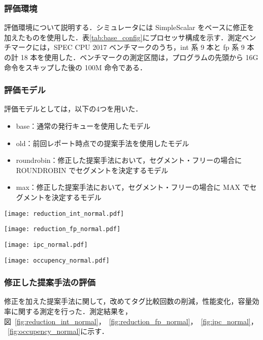 \documentclass[twocolumn]{jsarticle}
\begin{document}
  \subsubsection{評価環境}
  \label{sec:config}
  評価環境について説明する．シミュレータには SimpleScalar をベースに修正を加えたものを使用した．表\ref{tab:base_config}にプロセッサ構成を示す．測定ベンチマークには，SPEC CPU 2017 ベンチマークのうち，int 系 9 本と fp 系 9 本の計 18 本を使用した．ベンチマークの測定区間は，プログラムの先頭から 16G 命令をスキップした後の 100M 命令である．

  \subsubsection{評価モデル}
  評価モデルとしては，以下の4つを用いた．
  \begin{itemize}
    \item base：通常の発行キューを使用したモデル
    \item old：前回レポート時点での提案手法を使用したモデル
    \item roundrobin：修正した提案手法において，セグメント・フリーの場合にROUNDROBIN でセグメントを決定するモデル
    \item max：修正した提案手法において，セグメント・フリーの場合に MAX でセグメントを決定するモデル
  \end{itemize}

  \begin{figure*}[ht]
    \centering
    \texttt{[image: reduction\_int\_normal.pdf]}
    \caption{提案手法による比較器の動作回数削減率(int系)}
    \label{fig:reduction_int_normal}

    \texttt{[image: reduction\_fp\_normal.pdf]}
    \caption{提案手法による比較器の動作回数削減率(fp系)}
    \label{fig:reduction_fp_normal}
    
    \texttt{[image: ipc\_normal.pdf]}
    \caption{提案手法による IPC の変化}
    \label{fig:ipc_normal}

    \texttt{[image: occupency\_normal.pdf]}
    \caption{提案手法における IQ の占有率}
    \label{fig:occupency_normal}
  \end{figure*}

  \subsubsection{修正した提案手法の評価}
  修正を加えた提案手法に関して，改めてタグ比較回数の削減，性能変化，容量効率に関する測定を行った．測定結果を，図~\ref{fig:reduction_int_normal}，~\ref{fig:reduction_fp_normal}，~\ref{fig:ipc_normal}，~\ref{fig:occupency_normal}に示す．
\end{document}
